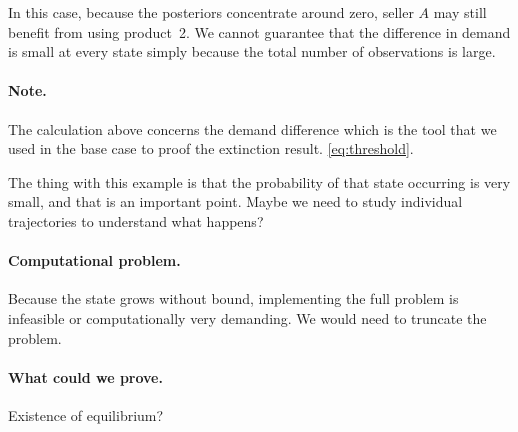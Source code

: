\documentclass[11pt]{article}
\begin{document}
In this case, because the posteriors concentrate around zero, seller $A$
may still benefit from using product~2. We cannot guarantee that the
difference in demand is small at every state simply because the total
number of observations is large.

\paragraph{Note.}
The calculation above concerns the demand difference which is the tool that we used in the base case to proof the extinction result. 
\eqref{eq:threshold}.

The thing with this example is that the probability of that state occurring is very small, and that is an important point. Maybe we need to study individual trajectories to understand what happens?

\paragraph{Computational problem.}
Because the state grows without bound, implementing the full problem is
infeasible or computationally very demanding. We would need to truncate
the problem.

\paragraph{What could we prove.}
Existence of equilibrium? 
\end{document}
